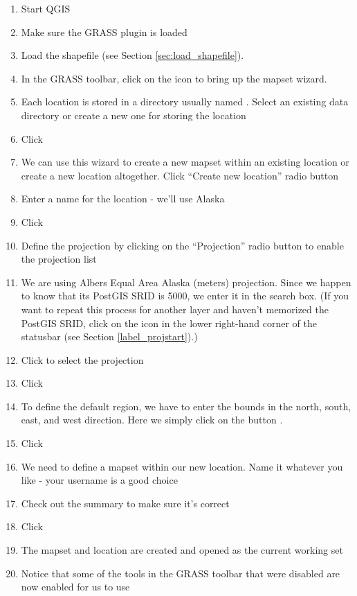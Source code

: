 \begin{enumerate}
  \item Start QGIS
  \item Make sure the GRASS plugin is loaded
  \item Load the  shapefile (see Section \ref{sec:load_shapefile}).
  \item In the GRASS toolbar, click on the  icon to bring up the mapset wizard.
  \item Each location is stored in a directory usually named
  . Select an existing data directory or create a new one
  for storing the location
  \item Click  
  \item We can use this wizard to create a new mapset within an existing 
  location or create a new location altogether. Click ``Create new location'' 
  radio button
  \item Enter a name for the location - we'll use Alaska
  \item Click  
  \item Define the projection by clicking on the ``Projection'' radio button 
  to enable the projection list
  \item We are using Albers Equal Area Alaska (meters) projection. Since we happen to know that 
  its PostGIS SRID is 5000, we enter it in the search box. (If you want to repeat this process 
  for another layer and haven't memorized the PostGIS SRID, click on the  icon in the lower right-hand corner of the statusbar (see Section \ref{label_projstart}).)
  \item Click  to select the projection
  \item Click  
  \item To define the default region, we have to enter the bounds in the north, south, 
  east, and west direction. Here we simply click on the button .
  \item Click  
  \item We need to define a mapset within our new location. Name it whatever 
  you like - your username is a good choice
  \item Check out the summary to make sure it's correct
  \item Click  
  \item The mapset and location are created and opened as the current 
  working set
  \item Notice that some of the tools in the GRASS toolbar that were 
  disabled are now enabled for us to use
\end{enumerate}


